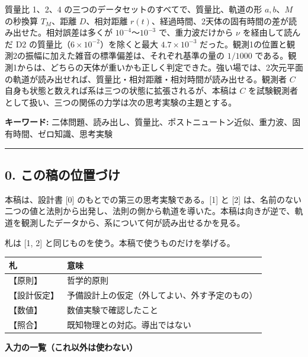 \documentclass[
  a4paper,
]{ltjsarticle}
\newcounter{none} %
\begin{document}
質量比 1、2、4 の三つのデータセットのすべてで、質量比、軌道の形
\(a, b\)、\(M\) の秒換算 \(T_M\)、距離 \(D\)、相対距離
\(r(t)\)、経過時間、2天体の固有時間の差が読み出せた。相対誤差は多くが
\(10^{-4}\)〜\(10^{-3}\) で、重力波だけから \(\nu\) を経由して読んだ D2
の質量比（\(6\times10^{-2}\)）を除くと最大 \(4.7\times10^{-3}\)
だった。観測1の位置と観測2の振幅に加えた雑音の標準偏差は、それぞれ基準の量の
\(1/1000\)
である。観測1からは、どちらの天体が重いかも正しく判定できた。強い場では、2次元平面の軌道が読み出せれば、質量比・相対距離・相対時間が読み出せる。観測者
\(C\) 自身も状態と数えれば系は三つの状態に拡張されるが、本稿は \(C\)
を試験観測者として扱い、三つの関係の力学は次の思考実験の主題とする。

\textbf{キーワード:}
二体問題、読み出し、質量比、ポストニュートン近似、重力波、固有時間、ゼロ知識、思考実験

\begin{center}\rule{0.5\linewidth}{0.5pt}\end{center}

\subsection{0.
この稿の位置づけ}\label{ux3053ux306eux7a3fux306eux4f4dux7f6eux3065ux3051}

本稿は、設計書 {[}0{]} のもとでの第三の思考実験である。{[}1{]} と
{[}2{]}
は、名前のない二つの値と法則から出発し、法則の側から軌道を導いた。本稿は向きが逆で、軌道を観測したデータから、系について何が読み出せるかを見る。

札は {[}1, 2{]} と同じものを使う。本稿で使うものだけを挙げる。

{\def\LTcaptype{none} %
\begin{longtable}[]{@{}ll@{}}
\toprule\noalign{}
札 & 意味 \\
\midrule\noalign{}
\endhead
\bottomrule\noalign{}
\endlastfoot
【原則】 & 哲学的原則 \\
【設計仮定】 & 予備設計上の仮定（外してよい、外す予定のもの） \\
【数値】 & 数値実験で確認したこと \\
【照合】 & 既知物理との対応。導出ではない \\
\end{longtable}
}

\textbf{入力の一覧（これ以外は使わない）}
\end{document}
